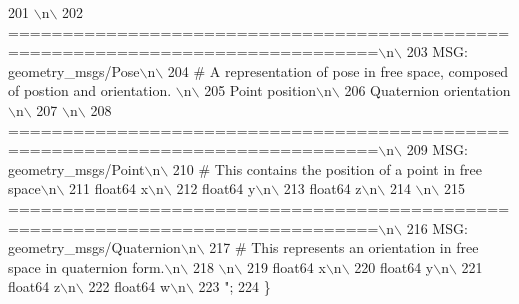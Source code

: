 \begin{DoxyCode}
201 \textcolor{stringliteral}{\(\backslash\)n\(\backslash\)}
202 \textcolor{stringliteral}{================================================================================\(\backslash\)n\(\backslash\)}
203 \textcolor{stringliteral}{MSG: geometry\_msgs/Pose\(\backslash\)n\(\backslash\)}
204 \textcolor{stringliteral}{# A representation of pose in free space, composed of postion and orientation. \(\backslash\)n\(\backslash\)}
205 \textcolor{stringliteral}{Point position\(\backslash\)n\(\backslash\)}
206 \textcolor{stringliteral}{Quaternion orientation\(\backslash\)n\(\backslash\)}
207 \textcolor{stringliteral}{\(\backslash\)n\(\backslash\)}
208 \textcolor{stringliteral}{================================================================================\(\backslash\)n\(\backslash\)}
209 \textcolor{stringliteral}{MSG: geometry\_msgs/Point\(\backslash\)n\(\backslash\)}
210 \textcolor{stringliteral}{# This contains the position of a point in free space\(\backslash\)n\(\backslash\)}
211 \textcolor{stringliteral}{float64 x\(\backslash\)n\(\backslash\)}
212 \textcolor{stringliteral}{float64 y\(\backslash\)n\(\backslash\)}
213 \textcolor{stringliteral}{float64 z\(\backslash\)n\(\backslash\)}
214 \textcolor{stringliteral}{\(\backslash\)n\(\backslash\)}
215 \textcolor{stringliteral}{================================================================================\(\backslash\)n\(\backslash\)}
216 \textcolor{stringliteral}{MSG: geometry\_msgs/Quaternion\(\backslash\)n\(\backslash\)}
217 \textcolor{stringliteral}{# This represents an orientation in free space in quaternion form.\(\backslash\)n\(\backslash\)}
218 \textcolor{stringliteral}{\(\backslash\)n\(\backslash\)}
219 \textcolor{stringliteral}{float64 x\(\backslash\)n\(\backslash\)}
220 \textcolor{stringliteral}{float64 y\(\backslash\)n\(\backslash\)}
221 \textcolor{stringliteral}{float64 z\(\backslash\)n\(\backslash\)}
222 \textcolor{stringliteral}{float64 w\(\backslash\)n\(\backslash\)}
223 \textcolor{stringliteral}{"};
224   \}
\end{DoxyCode}
